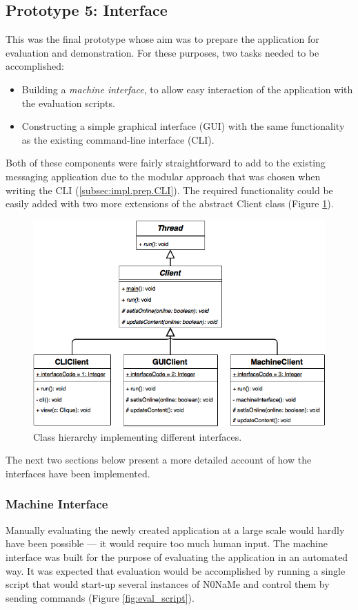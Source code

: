 \documentclass[a4paper, twoside, 12pt]{report}
\newcommand{\funkytt}{\fontfamily{AnonymousPro}\selectfont}
\begin{document}
\subsection{Prototype 5: Interface}
\label{subsec:impl.proto.interface}
This was the final prototype whose aim was to prepare the application for evaluation and demonstration. For these purposes, two tasks needed to be accomplished:
\begin{itemize}
    \item Building a \emph{machine interface}, to allow easy interaction of the application with the evaluation scripts.
    \item Constructing a simple graphical interface (GUI) with the same functionality as the existing command-line interface (CLI).
\end{itemize}

Both of these components were fairly straightforward to add to the existing messaging application due to the modular approach that was chosen when writing the CLI (\cref{subsec:impl.prep.CLI}). The required functionality could be easily added with two more extensions of the abstract Client class (Figure \ref{fig:Client_UI}).

\begin{figure}[H]
    \captionsetup{width=0.80\textwidth}
    \centering
    \includegraphics[width=0.76\linewidth]{pics/Client_UI.png}
    \caption{\label{fig:Client_UI} Class hierarchy implementing different interfaces.}
\end{figure}
The next two sections below present a more detailed account of how the interfaces have been implemented.

\subsubsection{Machine Interface}
Manually evaluating the newly created application at a large scale would hardly have been possible --- it would require too much human input. The machine interface was built for the purpose of evaluating the application in an automated way. It was expected that evaluation would be accomplished by running a single script that would start-up several instances of {\funkytt N0NaMe} and control them by sending commands (Figure \ref{fig:eval_script}).
\end{document}
